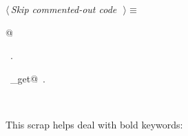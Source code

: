 \documentclass{report}
\begin{document}
\begin{flushleft} \small
\begin{minipage}{\linewidth} \label{scrap79}
$\langle\,${\it Skip commented-out code}\nobreak\ {\footnotesize {}}$\,\rangle\equiv$
\vspace{-1ex}
\begin{list}{}{} \item
\mbox{}@{\NWsep}
\end{list}
\vspace{-1ex}
\footnotesize\addtolength{\baselineskip}{-1ex}
\begin{list}{}{\setlength{\itemsep}{-\parsep}\setlength{\itemindent}{-\leftmargin}}
\item \NWtxtMacroRefIn\ .
\end{list}
\vspace{-2ex}
\footnotesize\addtolength{\baselineskip}{-1ex}
\begin{list}{}{\setlength{\itemsep}{-\parsep}\setlength{\itemindent}{-\leftmargin}}
\item \NWtxtIdentsUsed\nobreak\  \verb@source_get@\nobreak\ .\end{list}
\end{minipage}\\[4ex]
\end{flushleft}
This scrap helps deal with bold keywords:
\end{document}
